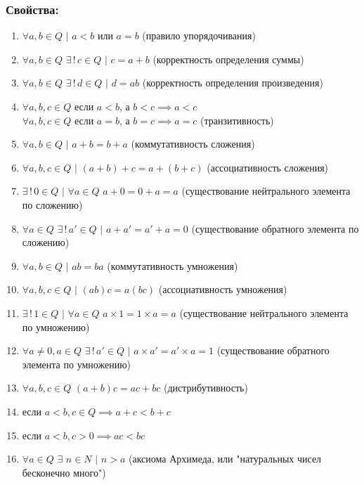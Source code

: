 \documentclass[12pt]{article}
\begin{document}
    \subsubsection*{Свойства:}
    \begin{enumerate}
        \item $\forall a,b \in Q$ $|$ $a < b$ или $a = b$ (правило упорядочивания)
        \item $\forall a,b \in Q$ $\exists\,!\,c \in Q$ $|$ $ c = a + b$ (корректность определения суммы)
        \item $\forall a,b \in Q$ $\exists\,!\,d \in Q$ $|$ $ d = ab$ (корректность определения произведения)
        \item $\forall a,b,c \in Q$ если $a < b$, а $b < c \implies a < c$\\$\forall a,b,c \in Q$ если $a = b$, а $b = c \implies a = c$ (транзитивность)
        \item $\forall a,b \in Q$ $|$ $a+b=b+a$ (коммутативность сложения)
        \item $\forall a,b,c \in Q$ $|$ $(a+b)+c = a+(b+c)$ (ассоциативность сложения)
        \item $\exists\,!\,0 \in Q$ $|$ $\forall a \in Q$ $a+0 = 0+a = a$ (существование нейтрального элемента по сложению)
        \item $\forall a \in Q$ $\exists\,!\,a' \in Q$ $|$ $a+a'=a'+a = 0$ (существование обратного элемента по сложению)
        \item $\forall a,b \in Q$ $|$ $ab=ba$ (коммутативность умножения)
        \item $\forall a,b,c \in Q$ $|$ $(ab)c = a(bc)$ (ассоциативность умножения)
        \item $\exists\,!\,1 \in Q$ $|$ $\forall a \in Q$ $a \times 1 = 1 \times a = a$ (существование нейтрального элемента по умножению)
        \item $\forall a \ne 0, a \in Q$ $\exists\,!\,a' \in Q$ $|$ $a \times a'=a' \times a = 1$ (существование обратного элемента по умножению)
        \item $\forall a,b,c \in Q$ $(a + b)c = ac + bc$ (дистрибутивность)
        \item если $a < b, c \in Q \implies a+c < b+c$
        \item если $a < b, c > 0 \implies ac < bc$
        \item $\forall a \in Q$ $\exists$ $n \in N$ $|$ $n > a$ (аксиома Архимеда, или "натуральных чисел бесконечно много")
    \end{enumerate}
\end{document}
